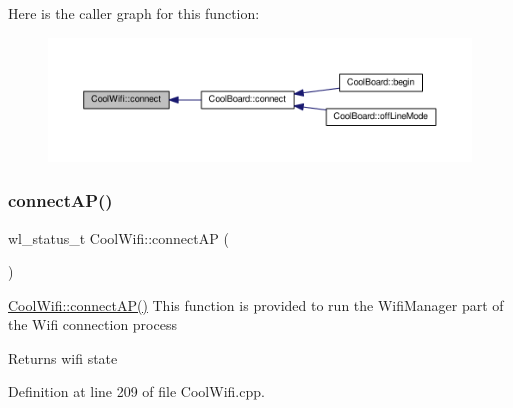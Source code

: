Here is the caller graph for this function\+:\nopagebreak
\begin{figure}[H]
\begin{center}
\leavevmode
\includegraphics[width=350pt]{d7/d29/class_cool_wifi_ad060353050f40d032a2dbf9e54a768bf_icgraph}
\end{center}
\end{figure}
\mbox{\label{class_cool_wifi_a7c857f27161782f5ef1d62d552aff971}} 
\subsubsection{\texorpdfstring{connect\+A\+P()}{connectAP()}}
{\footnotesize\ttfamily wl\+\_\+status\+\_\+t Cool\+Wifi\+::connect\+AP (\begin{DoxyParamCaption}{ }\end{DoxyParamCaption})}

\hyperlink{class_cool_wifi_a7c857f27161782f5ef1d62d552aff971}{Cool\+Wifi\+::connect\+A\+P()} This function is provided to run the Wifi\+Manager part of the Wifi connection process

\begin{DoxyReturn}{Returns}
wifi state 
\end{DoxyReturn}


Definition at line 209 of file Cool\+Wifi.\+cpp.


